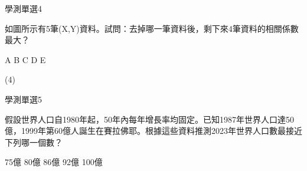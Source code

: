\begin{QUESTIONS}
    \begin{QUESTION}
        \begin{ExamInfo}{89}{學測}{單選}{4}
        \end{ExamInfo}
        \begin{ExamAnsRateInfo}{}{}{}{}
        \end{ExamAnsRateInfo}
        \begin{QBODY}
            如圖所示有5筆(X,Y)資料。試問：去掉哪一筆資料後，剩下來4筆資料的相關係數最大？
            \begin{QOPS}
                   \QOP A
                   \QOP B
                   \QOP C
                   \QOP D
                   \QOP E
            \end{QOPS}
        \end{QBODY}
        \begin{QFROMS}
        \end{QFROMS}
        \begin{QTAGS}\end{QTAGS}
        \begin{QANS}
			(4)
        \end{QANS}
        \begin{QSOLLIST}
        \end{QSOLLIST}
        \begin{QEMPTYSPACE}
        \end{QEMPTYSPACE}
    \end{QUESTION}
    \begin{QUESTION}
        \begin{ExamInfo}{89}{學測}{單選}{5}
        \end{ExamInfo}
        \begin{ExamAnsRateInfo}{}{}{}{}
        \end{ExamAnsRateInfo}
        \begin{QBODY}
            假設世界人口自1980年起，50年內每年增長率均固定。已知1987年世界人口達50億，1999年第60億人誕生在賽拉佛耶。根據這些資料推測2023年世界人口數最接近下列哪一個數？
            \begin{QOPS}
                \QOP 75億
                \QOP 80億
                \QOP 86億
                \QOP 92億
                \QOP 100億
            \end{QOPS}            
        \end{QBODY}
        \begin{QFROMS}
        \end{QFROMS}
        \begin{QTAGS}\end{QTAGS}

\end{QUESTION}
\end{QUESTIONS}
